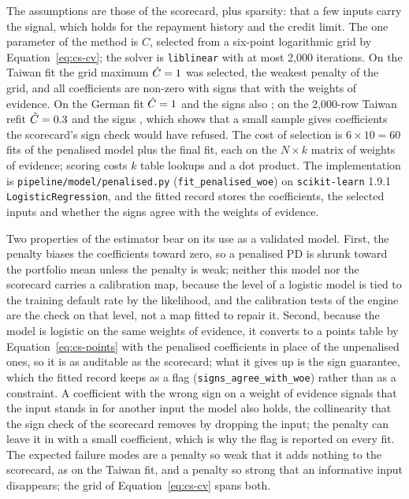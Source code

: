 The assumptions are those of the scorecard, plus sparsity: that a few inputs carry the signal, which holds for the repayment
history and the credit limit. The one parameter of the method is $C$, selected from a six-point logarithmic grid by
Equation~\eqref{eq:cs-cv}; the solver is \texttt{liblinear} with at most 2,000 iterations. On the Taiwan fit the grid maximum
$\hat C=1{}$ was selected, the weakest penalty of the grid, and all \csFitTwLlSel{} coefficients are non-zero with signs that \csFitTwLlSigns{} with the weights of evidence. On the German fit
$\hat C=1{}$ and the signs also \csFitGeLlSigns{}; on the 2,000-row Taiwan refit $\hat C=0.3{}$ and the signs
\csFitSmLlSigns{}, which shows that a small sample gives coefficients the scorecard's sign check would have refused. The cost of
selection is $6\times10=60$ fits of the penalised model plus the final fit, each on the $N\times k$ matrix of weights of evidence;
scoring costs $k$ table lookups and a dot product. The implementation is \texttt{pipeline/model/penalised.py}
(\texttt{fit\_penalised\_woe}) on \texttt{scikit-learn} 1.9.1 \texttt{LogisticRegression}, and the fitted record stores the
coefficients, the selected inputs and whether the signs agree with the weights of evidence.

Two properties of the estimator bear on its use as a validated model. First, the penalty biases the coefficients toward zero, so a
penalised PD is shrunk toward the portfolio mean unless the penalty is weak; neither this model nor the scorecard carries a
calibration map, because the level of a logistic model is tied to the training default rate by the likelihood, and the calibration
tests of the engine are the check on that level, not a map fitted to repair it. Second, because the model is logistic on the same
weights of evidence, it converts to a points table by Equation~\eqref{eq:cs-points} with the penalised coefficients in place of the
unpenalised ones, so it is as auditable as the scorecard; what it gives up is the sign guarantee, which the fitted record keeps as
a flag (\texttt{signs\_agree\_with\_woe}) rather than as a constraint. A coefficient with the wrong sign on a weight of evidence
signals that the input stands in for another input the model also holds, the collinearity that the sign check of the scorecard
removes by dropping the input; the penalty can leave it in with a small coefficient, which is why the flag is reported on every
fit. The expected failure modes are a penalty so weak that it adds nothing to the scorecard, as on the Taiwan fit, and a penalty so
strong that an informative input disappears; the grid of Equation~\eqref{eq:cs-cv} spans both.

